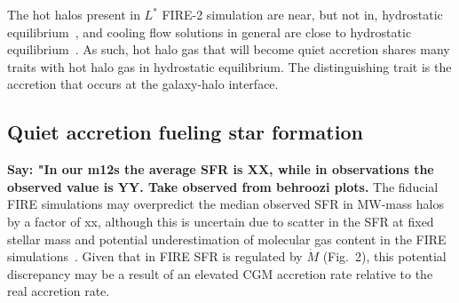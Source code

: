 \documentclass[fleqn,usenatbib]{mnras}
\newcommand{\Mdot}{\dot{M}}
\begin{document}
The hot halos present in $L^*$ FIRE-2 simulation are near, but not in, hydrostatic equilibrium~\citep{Esmerian2020, Stern2020}, and cooling flow solutions in general are close to hydrostatic equilibrium~\citep{Stern2019}.
As such, hot halo gas that will become quiet accretion shares many traits with hot halo gas in hydrostatic equilibrium.
The distinguishing trait is the accretion that occurs at the galaxy-halo interface.

\subsection{Quiet accretion fueling star formation}
\label{s: fueling}


\textbf{Say: "In our m12s the average SFR is XX, while in observations the observed value is YY. Take observed from behroozi plots.}
The fiducial FIRE simulations may overpredict the median observed SFR in MW-mass halos by a factor of xx, although this is uncertain due to scatter in the SFR at fixed stellar mass and potential underestimation of molecular gas content in the FIRE simulations~\citep{Sparre2017, Orr2018}.
Given that in FIRE SFR is regulated by $\Mdot$ (Fig.~2), this potential discrepancy may be a result of an elevated CGM accretion rate relative to the real accretion rate.
\end{document}
